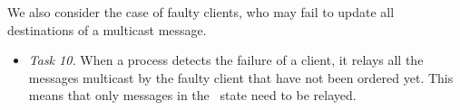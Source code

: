 We also consider the case of faulty clients, who may fail to update all destinations of a multicast message.

\begin{itemize}
\item \emph{Task 10.} 
When a process detects the failure of a client, it relays all the messages multicast by the faulty client that have not been ordered yet.
This means that only messages in the \mcast\ state need to be relayed.
\end{itemize}

%
%




